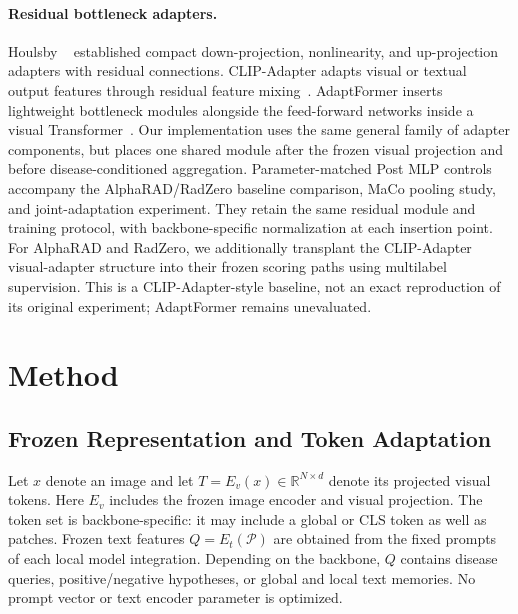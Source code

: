 \documentclass[10pt,twocolumn,letterpaper]{article}
\newcommand{\R}{\mathbb{R}}
\begin{document}
\paragraph{Residual bottleneck adapters.}
Houlsby \etal~\cite{houlsby2019adapters} established compact down-projection, nonlinearity, and up-projection adapters with residual connections. CLIP-Adapter adapts visual or textual output features through residual feature mixing~\cite{gao2024clipadapter}. AdaptFormer inserts lightweight bottleneck modules alongside the feed-forward networks inside a visual Transformer~\cite{chen2022adaptformer}. Our implementation uses the same general family of adapter components, but places one shared module after the frozen visual projection and before disease-conditioned aggregation. Parameter-matched Post MLP controls accompany the AlphaRAD/RadZero baseline comparison, MaCo pooling study, and joint-adaptation experiment. They retain the same residual module and training protocol, with backbone-specific normalization at each insertion point. For AlphaRAD and RadZero, we additionally transplant the CLIP-Adapter visual-adapter structure into their frozen scoring paths using multilabel supervision. This is a CLIP-Adapter-style baseline, not an exact reproduction of its original experiment; AdaptFormer remains unevaluated.

\section{Method}
\label{sec:method}
\subsection{Frozen Representation and Token Adaptation}
Let $x$ denote an image and let $T=E_v(x)\in\R^{N\times d}$ denote its projected visual tokens. Here $E_v$ includes the frozen image encoder and visual projection. The token set is backbone-specific: it may include a global or CLS token as well as patches. Frozen text features $Q=E_t(\mathcal P)$ are obtained from the fixed prompts of each local model integration. Depending on the backbone, $Q$ contains disease queries, positive/negative hypotheses, or global and local text memories. No prompt vector or text encoder parameter is optimized.
\end{document}
